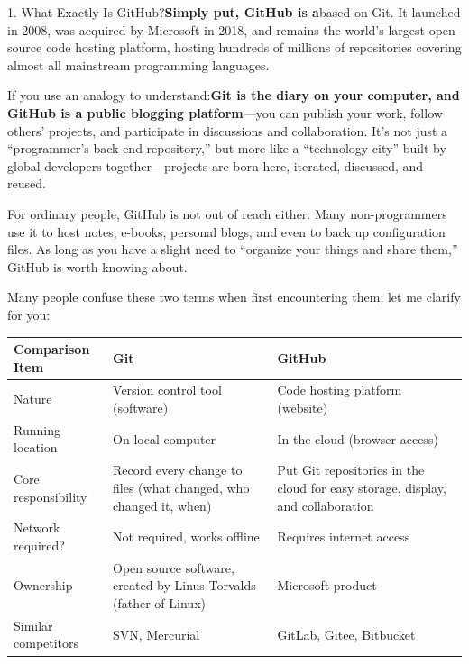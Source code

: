 


1. What Exactly Is GitHub?\textbf{Simply put, GitHub is a}based on Git. It launched in 2008, was acquired by Microsoft in 2018, and remains the world's largest open-source code hosting platform, hosting hundreds of millions of repositories covering almost all mainstream programming languages.

If you use an analogy to understand:\textbf{Git is the diary on your computer, and GitHub is a public blogging platform}—you can publish your work, follow others' projects, and participate in discussions and collaboration. It's not just a “programmer's back-end repository,” but more like a “technology city” built by global developers together—projects are born here, iterated, discussed, and reused.

For ordinary people, GitHub is not out of reach either. Many non-programmers use it to host notes, e-books, personal blogs, and even to back up configuration files. As long as you have a slight need to “organize your things and share them,” GitHub is worth knowing about.


Many people confuse these two terms when first encountering them; let me clarify for you:

\begin{center}
\begin{tabularx}{\linewidth}{|X|X|X|}
\hline
\textbf{Comparison Item} & \textbf{Git} & \textbf{GitHub} \tabularnewline
\hline
Nature & Version control tool (software) & Code hosting platform (website) \tabularnewline
Running location & On local computer & In the cloud (browser access) \tabularnewline
Core responsibility & Record every change to files (what changed, who changed it, when) & Put Git repositories in the cloud for easy storage, display, and collaboration \tabularnewline
Network required? & Not required, works offline & Requires internet access \tabularnewline
Ownership & Open source software, created by Linus Torvalds (father of Linux) & Microsoft product \tabularnewline
Similar competitors & SVN, Mercurial & GitLab, Gitee, Bitbucket \tabularnewline
\hline
\end{tabularx}
\end{center}

